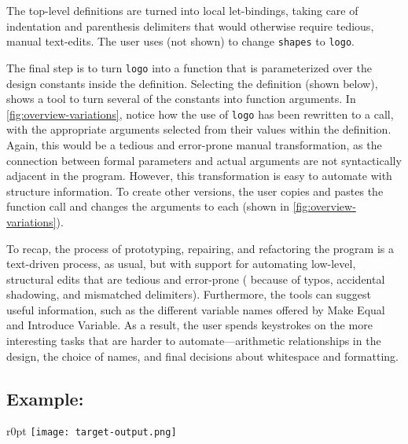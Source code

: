 

\noindent
The top-level definitions are turned into local
let-bindings, taking care of indentation and parenthesis delimiters
that would otherwise require tedious, manual text-edits. The user uses
 (not shown) to change \verb+shapes+ to \verb+logo+.

The final step
is to turn \verb+logo+ into a function that is parameterized over the
design constants inside the definition. Selecting the definition (shown below),
\deuce{} shows a  tool to turn several of the constants into
function arguments.
In \autoref{fig:overview-variations},
notice how the use of \verb+logo+ has been rewritten to a call, with
the appropriate arguments selected from their values within the
definition. Again, this would be a tedious and error-prone manual
transformation, as the connection between formal parameters and
actual arguments are
not syntactically adjacent in the program. However, this
transformation is easy to automate with structure information.
To create other versions, the user copies and pastes the
function call and changes the arguments to each (shown in
\autoref{fig:overview-variations}).



To recap, the process of prototyping, repairing, and refactoring the
program is a text-driven process, as usual, but with support for
automating low-level, structural edits that are tedious and
error-prone (\eg{} because of typos, accidental shadowing, and mismatched
delimiters). Furthermore, the tools can suggest useful information,
such as the different variable names offered by Make Equal and
Introduce Variable. As a result, the user spends keystrokes on the more
interesting tasks that are harder to automate---arithmetic
relationships in the design,
the choice of names, and
final decisions about whitespace and formatting.








\subsection{Example: \exampleOne{}}

\begin{wrapfigure}{r}{0pt}
\texttt{[image: target-output.png]}
\end{wrapfigure}

